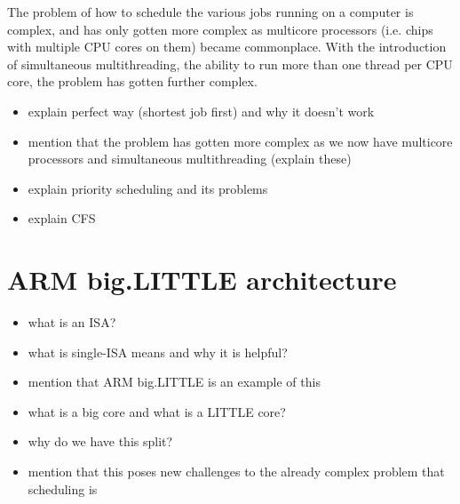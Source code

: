The problem of how to schedule the various
jobs running on a computer is complex, and has only gotten more complex as
multicore processors (i.e. chips with multiple CPU cores on them) became
commonplace. With the introduction of simultaneous multithreading, the ability
to run more than one thread per CPU core, the problem has gotten further
complex. 


\begin{itemize}
    \item explain perfect way (shortest job first) and why it doesn't work
    \item mention that the problem has gotten more complex as we now have
          multicore processors and simultaneous multithreading (explain these)
    \item explain priority scheduling and its problems
    \item explain CFS
\end{itemize}

\section{ARM big.LITTLE architecture}
\begin{itemize}
    \item what is an ISA?
    \item what is single-ISA means and why it is helpful?
    \item mention that ARM big.LITTLE is an example of this
    \item what is a big core and what is a LITTLE core?
    \item why do we have this split?
    \item mention that this poses new challenges to the already complex problem
          that scheduling is
\end{itemize}
